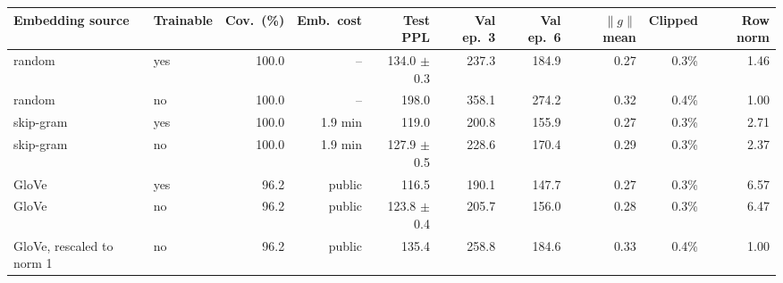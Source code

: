 \begin{tabular}{@{}llrrrrrrrr@{}}
\toprule
Embedding source & Trainable & Cov.\ (\%) & Emb.\ cost & Test PPL & Val ep.\ 3 & Val ep.\ 6 & $\|g\|$ mean & Clipped & Row norm \\
\midrule
random & yes & 100.0 & -- & 134.0 $\pm$ 0.3 & 237.3 & 184.9 & 0.27 & 0.3\% & 1.46 \\
random & no & 100.0 & -- & 198.0 & 358.1 & 274.2 & 0.32 & 0.4\% & 1.00 \\
skip-gram & yes & 100.0 & 1.9 min & 119.0 & 200.8 & 155.9 & 0.27 & 0.3\% & 2.71 \\
skip-gram & no & 100.0 & 1.9 min & 127.9 $\pm$ 0.5 & 228.6 & 170.4 & 0.29 & 0.3\% & 2.37 \\
GloVe & yes & 96.2 & public & 116.5 & 190.1 & 147.7 & 0.27 & 0.3\% & 6.57 \\
GloVe & no & 96.2 & public & 123.8 $\pm$ 0.4 & 205.7 & 156.0 & 0.28 & 0.3\% & 6.47 \\
GloVe, rescaled to norm 1 & no & 96.2 & public & 135.4 & 258.8 & 184.6 & 0.33 & 0.4\% & 1.00 \\
\bottomrule
\end{tabular}